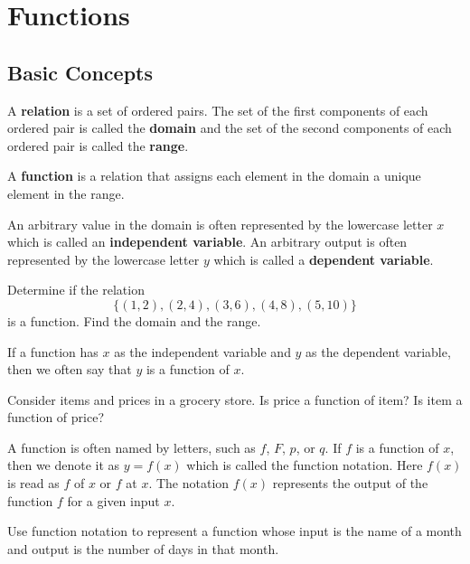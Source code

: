 
\section{Functions}

\subsection{Basic Concepts}
\begin{definition}
  A \textbf{relation} is a set of ordered pairs. The set of the first components of each ordered pair is called the \textbf{domain} and the set of the second components of each ordered pair is called the \textbf{range}.

  A \textbf{function} is a relation that assigns each element in the domain a unique element in the range.

  An arbitrary value in the domain is often represented by the lowercase letter $x$ which is called an \textbf{independent variable}.
  An arbitrary output is often represented by the lowercase letter $y$ which is called a \textbf{dependent variable}.
  
\end{definition}

\begin{example}
  Determine if the relation 
  \[\{(1,2),(2,4),(3,6),(4,8),(5,10)\}\]
  is a function. Find the domain and the range.
\end{example}


If a function has $x$ as the independent variable and $y$ as the dependent variable, then we often say that $y$ is a function of $x$.

\begin{example}
  Consider items and prices in a grocery store. Is price a function of item? Is item a function of price? 
\end{example}

  A function is often named by letters, such as $f$, $F$, $p$, or $q$. If $f$ is a function of $x$, then we denote it as $y=f(x)$ which is called the function notation. Here $f(x)$ is read as $f$ of $x$ or $f$ at $x$. The notation $f(x)$ represents the output of the function $f$ for a given input $x$.
  
\begin{example}
  Use function notation to represent a function whose input is the name of a month and output is the number of days in that month.
\end{example}

